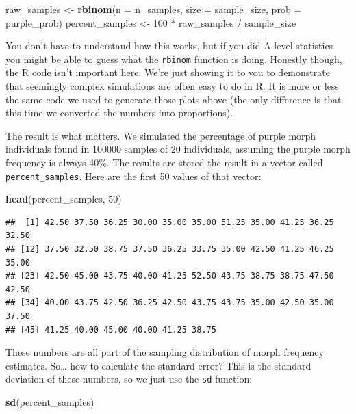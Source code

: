 \documentclass[]{book}
\newenvironment{Shaded}{\begin{snugshade}}{\end{snugshade}}
\newcommand{\KeywordTok}[1]{\textcolor[rgb]{0.13,0.29,0.53}{\textbf{{#1}}}}
\newcommand{\DataTypeTok}[1]{\textcolor[rgb]{0.13,0.29,0.53}{{#1}}}
\newcommand{\DecValTok}[1]{\textcolor[rgb]{0.00,0.00,0.81}{{#1}}}
\newcommand{\StringTok}[1]{\textcolor[rgb]{0.31,0.60,0.02}{{#1}}}
\newcommand{\NormalTok}[1]{{#1}}
\begin{document}
\begin{Shaded}
\begin{Highlighting}[]
\NormalTok{raw_samples <-}\StringTok{ }\KeywordTok{rbinom}\NormalTok{(}\DataTypeTok{n =} \NormalTok{n_samples, }\DataTypeTok{size =} \NormalTok{sample_size, }\DataTypeTok{prob =} \NormalTok{purple_prob)}
\NormalTok{percent_samples <-}\StringTok{ }\DecValTok{100} \NormalTok{*}\StringTok{ }\NormalTok{raw_samples /}\StringTok{ }\NormalTok{sample_size}
\end{Highlighting}
\end{Shaded}

You don't have to understand how this works, but if you did A-level
statistics you might be able to guess what the \texttt{rbinom} function
is doing. Honestly though, the R code isn't important here. We're just
showing it to you to demonstrate that seemingly complex simulations are
often easy to do in R. It is more or less the same code we used to
generate those plots above (the only difference is that this time we
converted the numbers into proportions).

The result is what matters. We simulated the percentage of purple morph
individuals found in 100000 samples of 20 individuals, assuming the
purple morph frequency is always 40\%. The results are stored the result
in a vector called \texttt{percent\_samples}. Here are the first 50
values of that vector:

\begin{Shaded}
\begin{Highlighting}[]
\KeywordTok{head}\NormalTok{(percent_samples, }\DecValTok{50}\NormalTok{)}
\end{Highlighting}
\end{Shaded}

\begin{verbatim}
##  [1] 42.50 37.50 36.25 30.00 35.00 35.00 51.25 35.00 41.25 36.25 32.50
## [12] 37.50 32.50 38.75 37.50 36.25 33.75 35.00 42.50 41.25 46.25 35.00
## [23] 42.50 45.00 43.75 40.00 41.25 52.50 43.75 38.75 38.75 47.50 42.50
## [34] 40.00 43.75 42.50 36.25 42.50 43.75 43.75 35.00 42.50 35.00 37.50
## [45] 41.25 40.00 45.00 40.00 41.25 38.75
\end{verbatim}

These numbers are all part of the sampling distribution of morph
frequency estimates. So\ldots{} how to calculate the standard error?
This is the standard deviation of these numbers, so we just use the
\texttt{sd} function:

\begin{Shaded}
\begin{Highlighting}[]
\KeywordTok{sd}\NormalTok{(percent_samples)}
\end{Highlighting}
\end{Shaded}
\end{document}
